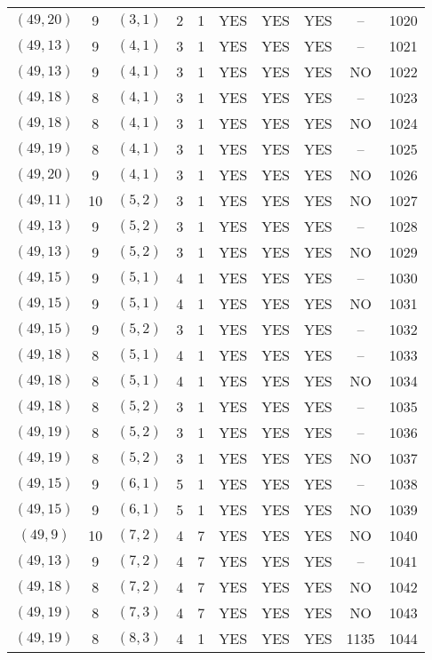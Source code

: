 \begin{longtable}{|c|c|c|c|c|c|c|c|c|c|}
$(49, 20)$ & 9 & $(3, 1)$ & 2 & 1 & YES & YES & YES & -- & 1020\\
$(49, 13)$ & 9 & $(4, 1)$ & 3 & 1 & YES & YES & YES & -- & 1021\\
$(49, 13)$ & 9 & $(4, 1)$ & 3 & 1 & YES & YES & YES & NO & 1022\\
$(49, 18)$ & 8 & $(4, 1)$ & 3 & 1 & YES & YES & YES & -- & 1023\\
$(49, 18)$ & 8 & $(4, 1)$ & 3 & 1 & YES & YES & YES & NO & 1024\\
$(49, 19)$ & 8 & $(4, 1)$ & 3 & 1 & YES & YES & YES & -- & 1025\\
$(49, 20)$ & 9 & $(4, 1)$ & 3 & 1 & YES & YES & YES & NO & 1026\\
$(49, 11)$ & 10 & $(5, 2)$ & 3 & 1 & YES & YES & YES & NO & 1027\\
$(49, 13)$ & 9 & $(5, 2)$ & 3 & 1 & YES & YES & YES & -- & 1028\\
$(49, 13)$ & 9 & $(5, 2)$ & 3 & 1 & YES & YES & YES & NO & 1029\\
$(49, 15)$ & 9 & $(5, 1)$ & 4 & 1 & YES & YES & YES & -- & 1030\\
$(49, 15)$ & 9 & $(5, 1)$ & 4 & 1 & YES & YES & YES & NO & 1031\\
$(49, 15)$ & 9 & $(5, 2)$ & 3 & 1 & YES & YES & YES & -- & 1032\\
$(49, 18)$ & 8 & $(5, 1)$ & 4 & 1 & YES & YES & YES & -- & 1033\\
$(49, 18)$ & 8 & $(5, 1)$ & 4 & 1 & YES & YES & YES & NO & 1034\\
$(49, 18)$ & 8 & $(5, 2)$ & 3 & 1 & YES & YES & YES & -- & 1035\\
$(49, 19)$ & 8 & $(5, 2)$ & 3 & 1 & YES & YES & YES & -- & 1036\\
$(49, 19)$ & 8 & $(5, 2)$ & 3 & 1 & YES & YES & YES & NO & 1037\\
$(49, 15)$ & 9 & $(6, 1)$ & 5 & 1 & YES & YES & YES & -- & 1038\\
$(49, 15)$ & 9 & $(6, 1)$ & 5 & 1 & YES & YES & YES & NO & 1039\\
$(49, 9)$ & 10 & $(7, 2)$ & 4 & 7 & YES & YES & YES & NO & 1040\\
$(49, 13)$ & 9 & $(7, 2)$ & 4 & 7 & YES & YES & YES & -- & 1041\\
$(49, 18)$ & 8 & $(7, 2)$ & 4 & 7 & YES & YES & YES & NO & 1042\\
$(49, 19)$ & 8 & $(7, 3)$ & 4 & 7 & YES & YES & YES & NO & 1043\\
$(49, 19)$ & 8 & $(8, 3)$ & 4 & 1 & YES & YES & YES & 1135 & 1044\\

\end{longtable}
